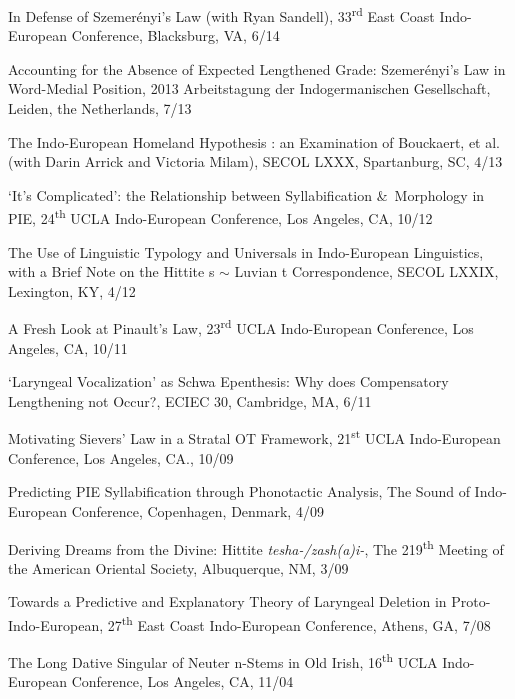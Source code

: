 \documentclass[paper=letter,fontsize=11pt]{scrartcl} %
\newcommand{\TalkEntry}[4]{
		\noindent #1, #2, #3 #4}
\begin{document}
\begin{etaremune}
\item\TalkEntry{In Defense of Szemerényi’s Law (with Ryan Sandell)}{33\textsuperscript{rd} East Coast Indo-European Conference, Blacksburg, VA}{6/14}
\item\TalkEntry{Accounting for the Absence of Expected Lengthened Grade: Szemerényi's Law in Word-Medial Position}{2013 Arbeitstagung der Indogermanischen Gesellschaft, Leiden, the Netherlands}{7/13}
\item\TalkEntry{The Indo-European Homeland Hypothesis : an Examination of Bouckaert, et al. (with Darin Arrick and Victoria Milam)}{SECOL LXXX, Spartanburg, SC}{4/13}
\item\TalkEntry{`It's Complicated': the Relationship between Syllabification \&~Morphology in PIE}{24\textsuperscript{th} UCLA Indo-European Conference, Los Angeles, CA}{10/12}
\item\TalkEntry{The Use of Linguistic Typology and Universals in Indo-European Linguistics, with a Brief Note on the Hittite s $\sim$ Luvian t Correspondence}{SECOL LXXIX, Lexington, KY}{4/12}
\item\TalkEntry{A Fresh Look at Pinault’s Law}{23\textsuperscript{rd} UCLA Indo-European Conference, Los Angeles, CA}{10/11}
\item\TalkEntry{`Laryngeal Vocalization’ as Schwa Epenthesis: Why does Compensatory Lengthening not Occur?}{ECIEC 30, Cambridge, MA}{6/11} 
\item\TalkEntry{Motivating Sievers’ Law in a Stratal OT Framework}{21\textsuperscript{st} UCLA Indo-European Conference, Los Angeles, CA.}{10/09}
\item\TalkEntry{Predicting PIE Syllabification through Phonotactic Analysis}{The Sound of Indo-European Conference, Copenhagen, Denmark}{4/09} 
\item\TalkEntry{Deriving Dreams from the Divine: Hittite \textit{tesha-/zash(a)i-}}{The 219\textsuperscript{th} Meeting of the American Oriental Society, Albuquerque, NM}{3/09} 
\item\TalkEntry{Towards a Predictive and Explanatory Theory of Laryngeal Deletion in Proto-Indo-European}{27\textsuperscript{th} East Coast Indo-European Conference, Athens, GA}{7/08}
\item\TalkEntry{The Long Dative Singular of Neuter n-Stems in Old Irish}{16\textsuperscript{th} UCLA Indo-European Conference, Los Angeles, CA}{11/04}
\end{etaremune}



\end{document}
